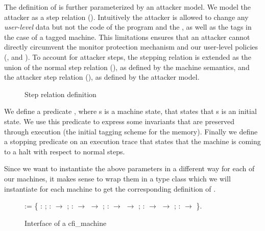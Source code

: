 The definition of \CFI is further parameterized by an attacker model. We
model the attacker as a step relation (\stepa{}{}). Intuitively the attacker is
allowed to change any \emph{user-level} data but not the code of the program and
the \pc, as well as the tags in the case of a tagged machine. 
This limitations ensures that an attacker cannot directly circumvent the monitor
protection mechanism and our user-level policies (\NWC , \NXD and \CFI). To 
account for attacker steps, the stepping relation is extended as the union of 
the normal step relation (\stepn{}{}), as defined by the machine semantics, and
the attacker step relation (\stepa{}{}), as defined by the attacker model.

\begin{figure}[ht]
\centering
\begin{minipage}[b]{0.25\linewidth}
\centering
{}
\label{fig:step_stepn}
\end{minipage}
\hspace{0.5cm}
\begin{minipage}[b]{0.15\linewidth}
\centering
{}
\label{fig:step_stepa}
\end{minipage}
\caption{Step relation definition}
\end{figure}

We define a predicate , where s is a machine state, that
states that s is an initial state. We use this predicate to express some
invariants that are preserved through execution (\EG the initial tagging scheme
for the memory). Finally we define a stopping predicate on an execution trace
that states that the machine is coming to a halt with respect to normal steps.

Since we want to instantiate the above parameters in a different way for
each of our machines, it makes sense to wrap them in a type class which
we will instantiate for each machine to get the corresponding definition
of \CFI.

\begin{figure}[ht]
\begin{coqdoccode}
  \coqdocnoindent {}  :=
  \{\coqdoceol \coqdocindent{1.00em}  :
  ;\coqdoceol \coqdocindent{1.00em} 
  :  \ensuremath{\rightarrow}
  ;\coqdoceol \coqdocindent{1.00em} \coqdoceol
  \coqdocindent{1.00em}  : 
  \ensuremath{\rightarrow}  \ensuremath{\rightarrow}
  ;\coqdoceol \coqdocindent{1.00em} 
  :  \ensuremath{\rightarrow} 
  \ensuremath{\rightarrow} ;\coqdoceol \coqdocnoindent
  \coqdoceol \coqdocindent{1.00em}  :
   \ensuremath{\rightarrow} 
  \ensuremath{\rightarrow} ;\coqdoceol
  \coqdocindent{1.00em}  : 
   \ensuremath{\rightarrow} \coqdoceol
  \coqdocnoindent \}.\coqdoceol
\end{coqdoccode}
\caption{Interface of a cfi\_machine}
\label{fig:cfi_machine}
\end{figure}

